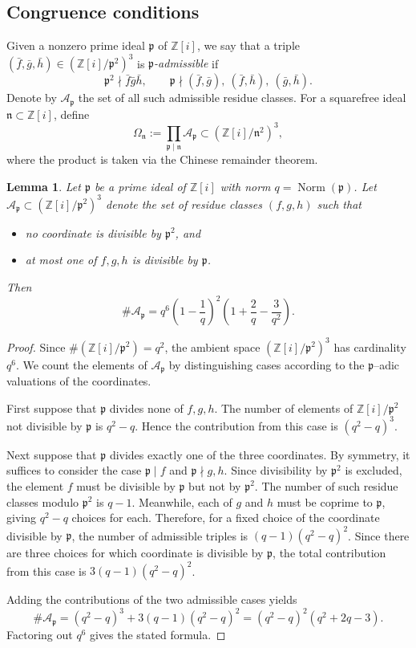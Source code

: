 \documentclass{amsart}
\newcommand{\op}[1]{\operatorname{#1}}
\newcommand{\Z}{\mathbb{Z}}
\theoremstyle{plain}
\newtheorem{lemma}[theorem]{Lemma}
\theoremstyle{definition}
\theoremstyle{remark}
\numberwithin{equation}{section}
\begin{document}
\subsection{Congruence conditions}
Given a nonzero prime ideal $\mathfrak p$ of $\Z[i]$, we say that a triple
$(\bar f,\bar g,\bar h)\in(\Z[i]/\mathfrak p^2)^3$ is
\emph{$\mathfrak p$-admissible} if
\[
\mathfrak p^2\nmid \bar f\bar g\bar h,
\qquad
\mathfrak p\nmid (\bar f,\bar g),\ (\bar f,\bar h),\ (\bar g,\bar h).
\]
Denote by $\mathcal A_{\mathfrak p}$ the set of all such admissible
residue classes. For a squarefree ideal $\mathfrak n\subset\Z[i]$, define
\[
\Omega_{\mathfrak n}
:=
\prod_{\mathfrak p\mid\mathfrak n}\mathcal A_{\mathfrak p}
\subset
(\Z[i]/\mathfrak n^2)^3,
\]
where the product is taken via the Chinese remainder theorem. 
\begin{lemma}\label{lem:local-density}
Let $\mathfrak p$ be a prime ideal of $\Z[i]$ with norm
$q=\op{Norm}(\mathfrak p)$. Let $\mathcal A_{\mathfrak p}\subset
(\Z[i]/\mathfrak p^2)^3$ denote the set of residue classes
$(f,g,h)$ such that
\begin{itemize}
\item no coordinate is divisible by $\mathfrak p^2$, and
\item at most one of $f,g,h$ is divisible by $\mathfrak p$.
\end{itemize}
Then
\[
\#\mathcal A_{\mathfrak p}
=
q^6\left(1-\frac{1}{q}\right)^2
\left(1+\frac{2}{q}-\frac{3}{q^2}\right).
\]
\end{lemma}

\begin{proof}
Since $\#(\Z[i]/\mathfrak p^2)=q^2$, the ambient space
$(\Z[i]/\mathfrak p^2)^3$ has cardinality $q^6$. We count the elements of
$\mathcal A_{\mathfrak p}$ by distinguishing cases according to the
$\mathfrak p$--adic valuations of the coordinates.
\par First suppose that $\mathfrak p$ divides none of $f,g,h$. The number of
elements of $\Z[i]/\mathfrak p^2$ not divisible by $\mathfrak p$ is
$q^2-q$. Hence the contribution from this case is $(q^2-q)^3$.
\par Next suppose that $\mathfrak p$ divides exactly one of the three
coordinates. By symmetry, it suffices to consider the case
$\mathfrak p\mid f$ and $\mathfrak p\nmid g,h$. Since divisibility by
$\mathfrak p^2$ is excluded, the element $f$ must be divisible by
$\mathfrak p$ but not by $\mathfrak p^2$. The number of such residue
classes modulo $\mathfrak p^2$ is $q-1$. Meanwhile, each of $g$ and $h$
must be coprime to $\mathfrak p$, giving $q^2-q$ choices for each.
Therefore, for a fixed choice of the coordinate divisible by
$\mathfrak p$, the number of admissible triples is $(q-1)(q^2-q)^2$. Since there are three choices for which coordinate is divisible by
$\mathfrak p$, the total contribution from this case is $3(q-1)(q^2-q)^2$.
\par Adding the contributions of the two admissible cases yields
\[
\#\mathcal A_{\mathfrak p}
=
(q^2-q)^3 + 3(q-1)(q^2-q)^2
=
(q^2-q)^2(q^2+2q-3).
\]
Factoring out $q^6$ gives the stated formula.
\end{proof}
\end{document}

